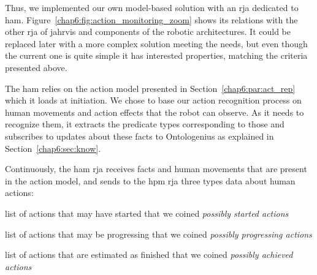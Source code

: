 \documentclass[a4paper,11pt,twoside]{StyleThese}
\begin{document}
Thus, we implemented our own model-based solution with an \acrshort{rja} dedicated to \acrfull{ham}. Figure~\ref{chap6:fig:action_monitoring_zoom} shows its relations with the other \acrshort{rja} of \acrshort{jahrvis}  and components of the robotic architectures. It could be replaced later with a more complex solution meeting the needs, but even though the current one is quite simple it has interested properties, matching the criteria presented above.

The \acrshort{ham} relies on the action model presented in Section~\ref{chap6:par:act_rep} which it loads at initiation. We chose to base our action recognition process on human movements and action effects that the robot can observe. As it needs to recognize them, it extracts the predicate types corresponding to those and subscribes to updates about these facts to Ontologenius as explained in Section~\ref{chap6:sec:know}. 

Continuously, the \acrshort{ham} \acrshort{rja} receives facts and human movements that are present in the action model, and sends to the \acrfull{hpm} \acrshort{rja} three types data about human actions: 
\begin{bulletList}
	\item list of actions that may have started that we coined \emph{possibly started actions}
	\item list of actions that may be progressing that we coined \emph{possibly progressing actions}
	\item list of actions that are estimated as finished that we coined \emph{possibly achieved actions} 
\end{bulletList}
\end{document}
